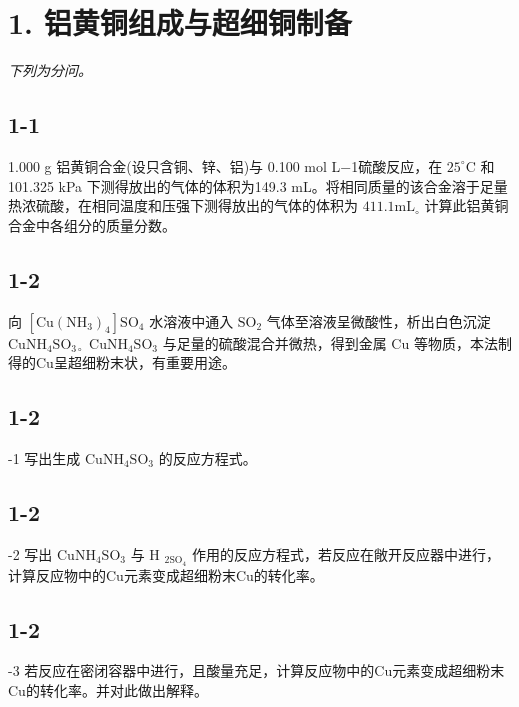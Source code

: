 \section*{1. 铝黄铜组成与超细铜制备}
\textit{下列为分问。}

\subsection*{1-1}
1.000 g 铝⻩铜合⾦(设只含铜、锌、铝)与 0.100 mol L−1硫酸反应，在 $2 5 ^ { \circ } \mathrm { C }$ 和 101.325 kPa 下测得放出的⽓体的体积为149.3 mL。将相同质量的该合⾦溶于⾜量热浓硫酸，在相同温度和压强下测得放出的⽓体的体积为 $4 1 1 . 1 \mathrm { m L } _ { \circ }$ 计算此铝⻩铜合⾦中各组分的质量分数。

\subsection*{1-2}
向 $\mathrm { [ C u ( N H _ { 3 } ) _ { 4 } ] S O _ { 4 } }$ ⽔溶液中通⼊ $\mathrm { S O } _ { 2 }$ ⽓体⾄溶液呈微酸性，析出⽩⾊沉淀 $\mathrm { C u N H _ { 4 } S O _ { 3 \circ } }$ $\mathrm { C u N H _ { 4 } S O _ { 3 } }$ 与⾜量的硫酸混合并微热，得到⾦属 $\mathrm { C u }$ 等物质，本法制得的Cu呈超细粉末状，有重要⽤途。

\subsection*{1-2}
-1 写出⽣成 $\mathrm { C u N H _ { 4 } S O _ { 3 } }$ 的反应⽅程式。

\subsection*{1-2}
-2 写出 $\mathrm { C u N H _ { 4 } S O _ { 3 } }$ 与 H $\mathrm { _ { 2 S O _ { 4 } } }$ 作⽤的反应⽅程式，若反应在敞开反应器中进⾏，计算反应物中的Cu元素变成超细粉末Cu的转化率。

\subsection*{1-2}
-3 若反应在密闭容器中进⾏，且酸量充⾜，计算反应物中的Cu元素变成超细粉末Cu的转化率。并对此做出解释。
